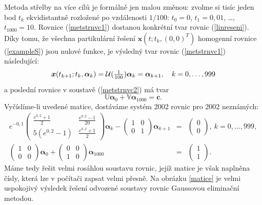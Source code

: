 \documentclass[a4paper, 12pt]{book}
\theoremstyle{definition}
\def\vc#1{\mathbf{\boldsymbol{#1}}}     %
\def\tn#1{{\mathbb{#1}}}    %
\begin{document}
Metoda střelby na více cílů je formálně jen malou změnou: zvolme si tisíc jeden bod 
$t_k$ ekvidistantně rozložené po vzdálenosti $1/100$: $t_0=0$, $t_1=0,{}01$, 
\dots, $t_{1000}=10$. Rovnice (\ref{metstrnvc1}) dostanou konkrétní tvar rovnic
(\ref{linreseni}). Díky tomu, že všechna partikulární řešení $\vc x(t;t_k,(0,0)^T)$ 
homogenní rovnice (\ref{exampleS}) jsou nulové funkce, je výsledný tvar rovnic
(\ref{metstrnvc1}) následující:
\begin{displaymath}
\vc x(t_{k+1};t_k,\vc\alpha_k)={\cal U}(\textstyle{\frac 1{100}})\vc\alpha_k=\vc\alpha_{k+1}, ~~~k=0,\dots,999
\end{displaymath}
a poslední rovnice v soustavě (\ref{metstrnvc2}) má tvar
\begin{displaymath}
{\tn U}\vc\alpha_0+{\tn V}\vc\alpha_{1000}=\vc c.
\end{displaymath}
Vyčíslíme-li uvedené matice, dostáváme systém 2002 rovnic pro 2002 neznámých:
\begin{eqnarray*}
e^{-0,{}1}\left(\begin{array}{cc}\frac{e^{0,{}2}+1}2&\frac{e^{0,{}2}-1}{20}\\5(e^{0,{}2}-1)&\frac{e^{0,{}2}+1}2\end{array}\right)\vc\alpha_k-\left(\begin{array}{cc}1&0\\ 0&1\end{array}\right)\vc\alpha_{k+1}\!\!&\!\!=\!\!&\!\!\left(\begin{array}{c}0\\ 0\end{array}\right),~k=0,\dots,999,\\
\left(\begin{array}{cc}1&0\\ 0&0\end{array}\right)\vc\alpha_0+\left(\begin{array}{cc}0&0\\ 1&0\end{array}\right)\vc\alpha_{1000}\!\!&\!\!=\!\!&\!\!\left(\begin{array}{c}1\\ 1\end{array}\right).
\end{eqnarray*}
Máme tedy řešit velmi rosáhlou soustavu rovnic, jejíž matice je však naplněna čísly, 
která lze v počítači zapsat velmi přesně. Na obrázku \ref{matice} je velmi uspokojivý 
výsledek řešení odvozené soustavy rovnic Gaussovou eliminační metodou.
\end{document}
